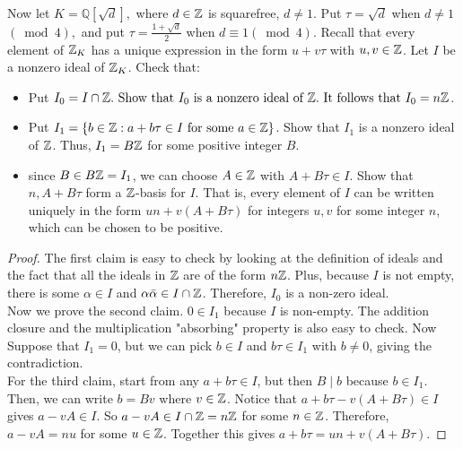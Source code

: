 \documentclass[12pt,twoside=semi,openright,numbers=noenddot]{scrbook}
\begin{document}
\begin{problem}
    Now let $K=\mathbb{Q}[\sqrt{d}],$ where $d \in \mathbb Z$ is squarefree, $d \neq 1 .$ Put $\tau=\sqrt{d}$ when $d \neq 1$ $(\bmod 4),$ and put 
    $\tau=\frac{1+\sqrt{d}}{2}$ when $d \equiv 1(\bmod 4)$. Recall that every element of $\mathbb Z_{K}$ has a unique expression in the form $u+v \tau$ with $u, v \in \mathbb Z$.
    Let $I$ be a nonzero ideal of $\mathbb Z_{K}$. Check that:
    \begin{itemize}
        \item Put $I_{0}=I \cap \mathbb Z . \text { Show that } I_0 \text { is a nonzero ideal of } \mathbb Z . \text { It follows that } I_{0}=n \mathbb Z$.
        \item Put $I_{1}=\{b \in \mathbb Z: a+b \tau \in I \text { for some } a \in \mathbb Z\}$. Show that $I_{1}$ is a nonzero ideal of $\mathbb Z$. Thus, $I_{1}=B \mathbb Z$ for some positive integer $B$.
        \item since $B \in B \mathbb Z=I_{1}$, we can choose $A \in \mathbb Z$ with $A+B \tau \in I$. Show that $n, A+B \tau$ form a $\mathbb Z$-basis for $I$. 
            That is, every element of $I$ can be written uniquely in the form $u n+v(A+B \tau)$ for integers $u, v$ 
            for some integer $n$, which can be chosen to be positive.
    \end{itemize}
\end{problem}
    \begin{proof}
        The first claim is easy to check by looking at the definition of ideals and the fact that all the ideals in $\mathbb Z$ are of the form $n\mathbb Z$. Plus, because $I$ is not empty, 
        there is some $\alpha \in I$ and $\alpha\bar{\alpha}\in I \cap \mathbb Z$. Therefore, $I_0$ is a non-zero ideal.\\
        \newline
        Now we prove the second claim. $0 \in I_1$ because $I$ is non-empty. The addition closure and the multiplication "absorbing" property is also easy to check. 
        Now Suppose that $I_1 = {0}$, but we can pick $b \in I$ and $b\tau \in I_1$ with $b \neq 0$, giving the contradiction.\\
        \newline
        For the third claim, start from any $a+b\tau \in I$, but then $B \mid b$ because $b \in I_1$. Then, we can write $b = Bv$ where $v \in \mathbb Z$. Notice that 
        $a+b\tau - v(A+B\tau) \in I$ gives $a-vA \in I$. So $a-vA \in I \cap \mathbb Z = n\mathbb Z$ for some $n \in \mathbb Z$. Therefore, $a-vA = nu$ for some $u \in \mathbb Z$.  
        Together this gives $a+b\tau = un+v(A+B\tau)$. 
    \end{proof}
\end{document}
